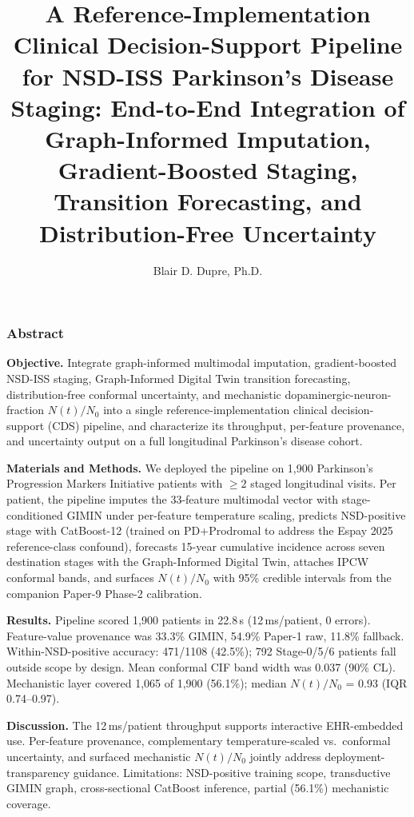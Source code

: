 \documentclass[11pt,letterpaper]{article}
\title{\bfseries A Reference-Implementation Clinical Decision-Support Pipeline for NSD-ISS Parkinson's Disease Staging: End-to-End Integration of Graph-Informed Imputation, Gradient-Boosted Staging, Transition Forecasting, and Distribution-Free Uncertainty}
\author[1]{Blair D. Dupre, Ph.D.}
\affil[1]{Department of Biomedical Engineering, University of North Dakota, Grand Forks, ND, USA}
\date{}
\begin{document}
\maketitle
\vspace{-2em}

\subsubsection*{Abstract}

\noindent\textbf{Objective.}
Integrate graph-informed multimodal imputation, gradient-boosted NSD-ISS staging, Graph-Informed Digital Twin transition forecasting, distribution-free conformal uncertainty, and mechanistic dopaminergic-neuron-fraction $N(t)/N_0$ into a single reference-implementation clinical decision-support (CDS) pipeline, and characterize its throughput, per-feature provenance, and uncertainty output on a full longitudinal Parkinson's disease cohort.

\noindent\textbf{Materials and Methods.}
We deployed the pipeline on 1,900 Parkinson's Progression Markers Initiative patients with $\geq 2$ staged longitudinal visits. Per patient, the pipeline imputes the 33-feature multimodal vector with stage-conditioned GIMIN under per-feature temperature scaling, predicts NSD-positive stage with CatBoost-12 (trained on PD+Prodromal to address the Espay 2025 reference-class confound), forecasts 15-year cumulative incidence across seven destination stages with the Graph-Informed Digital Twin, attaches IPCW conformal bands, and surfaces $N(t)/N_0$ with 95\% credible intervals from the companion Paper-9 Phase-2 calibration.

\noindent\textbf{Results.}
Pipeline scored 1,900 patients in 22.8\,s (12\,ms/patient, 0 errors). Feature-value provenance was 33.3\% GIMIN, 54.9\% Paper-1 raw, 11.8\% fallback. Within-NSD-positive accuracy: 471/1108 (42.5\%); 792 Stage-0/5/6 patients fall outside scope by design. Mean conformal CIF band width was 0.037 (90\% CL). Mechanistic layer covered 1,065 of 1,900 (56.1\%); median $N(t)/N_0$ = 0.93 (IQR 0.74--0.97).

\noindent\textbf{Discussion.}
The 12\,ms/patient throughput supports interactive EHR-embedded use. Per-feature provenance, complementary temperature-scaled vs.\ conformal uncertainty, and surfaced mechanistic $N(t)/N_0$ jointly address deployment-transparency guidance. Limitations: NSD-positive training scope, transductive GIMIN graph, cross-sectional CatBoost inference, partial (56.1\%) mechanistic coverage.
\end{document}
